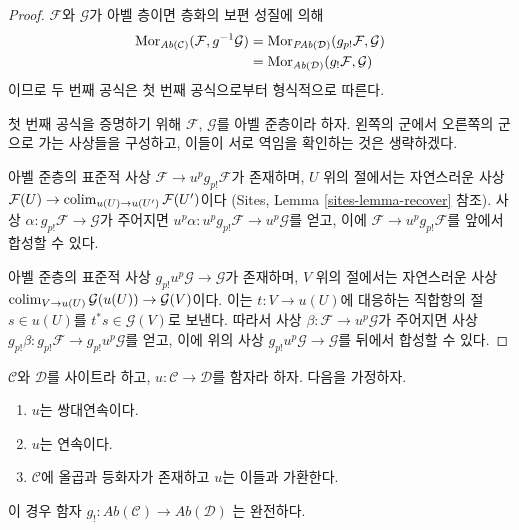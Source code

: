 \begin{proof}
$\mathcal{F}$와 $\mathcal{G}$가 아벨 층이면 층화의 보편 성질에 의해
\begin{align*}
\mathop{\mathrm{Mor}}\nolimits_{\textit{Ab}(\mathcal{C})}(\mathcal{F}, g^{-1}\mathcal{G})
& =
\mathop{\mathrm{Mor}}\nolimits_{\textit{PAb}(\mathcal{D})}(g_{p!}\mathcal{F}, \mathcal{G}) \\
& =
\mathop{\mathrm{Mor}}\nolimits_{\textit{Ab}(\mathcal{D})}(g_!\mathcal{F}, \mathcal{G})
\end{align*}
이므로 두 번째 공식은 첫 번째 공식으로부터 형식적으로 따른다.

\medskip\noindent
첫 번째 공식을 증명하기 위해 $\mathcal{F}$, $\mathcal{G}$를 아벨
준층이라 하자. 왼쪽의 군에서 오른쪽의 군으로 가는 사상들을 구성하고,
이들이 서로 역임을 확인하는 것은 생략하겠다.

\medskip\noindent
아벨 준층의 표준적 사상 $\mathcal{F} \to u^pg_{p!}\mathcal{F}$가
존재하며, $U$ 위의 절에서는 자연스러운 사상
$\mathcal{F}(U) \to \mathop{\mathrm{colim}}\nolimits_{u(U) \to u(U')} \mathcal{F}(U')$이다
(Sites, Lemma \ref{sites-lemma-recover} 참조).
사상 $\alpha : g_{p!}\mathcal{F} \to \mathcal{G}$가 주어지면
$u^p\alpha : u^pg_{p!}\mathcal{F} \to u^p\mathcal{G}$를 얻고, 이에
$\mathcal{F} \to u^pg_{p!}\mathcal{F}$를 앞에서 합성할 수 있다.

\medskip\noindent
아벨 준층의 표준적 사상 $g_{p!}u^p\mathcal{G} \to \mathcal{G}$가
존재하며, $V$ 위의 절에서는 자연스러운 사상
$\mathop{\mathrm{colim}}\nolimits_{V \to u(U)} \mathcal{G}(u(U)) \to \mathcal{G}(V)$이다.
이는 $t : V \to u(U)$에 대응하는 직합항의 절 $s \in u(U)$를
$t^*s \in \mathcal{G}(V)$로 보낸다. 따라서 사상
$\beta : \mathcal{F} \to u^p\mathcal{G}$가 주어지면 사상
$g_{p!}\beta : g_{p!}\mathcal{F} \to g_{p!}u^p\mathcal{G}$를 얻고,
이에 위의 사상 $g_{p!}u^p\mathcal{G} \to \mathcal{G}$를 뒤에서
합성할 수 있다.
\end{proof}

\begin{lemma}
\label{lemma-exactness-lower-shriek}
$\mathcal{C}$와 $\mathcal{D}$를 사이트라 하고,
$u : \mathcal{C} \to \mathcal{D}$를 함자라 하자. 다음을 가정하자.
\begin{enumerate}
\item[(a)] $u$는 쌍대연속이다.
\item[(b)] $u$는 연속이다.
\item[(c)] $\mathcal{C}$에 올곱과 등화자가 존재하고 $u$는 이들과 가환한다.
\end{enumerate}
이 경우 함자
$g_! : \textit{Ab}(\mathcal{C}) \to \textit{Ab}(\mathcal{D})$
는 완전하다.
\end{lemma}

